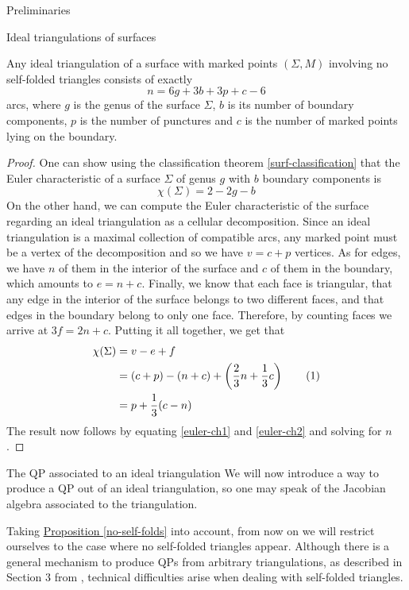 \begin{chapter}{Preliminaries}
\begin{section}{Ideal triangulations of surfaces}
\begin{prop} Any ideal triangulation of a surface with marked points $(\Sigma, M)$ involving no self-folded triangles consists of exactly
\[
n=6g+3b+3p+c-6
\]
arcs, where $g$ is the genus of the surface $\Sigma$, $b$ is its number of boundary components, $p$ is the number of punctures and $c$ is the number of marked points lying on the boundary.
\end{prop}
\begin{proof} One can show using the classification theorem \ref{surf-classification} that the Euler characteristic of a surface $\Sigma$ of genus $g$ with $b$ boundary components is
\begin{equation}\label{euler-ch1}
\chi(\Sigma)=2-2g-b
\end{equation}
On the other hand, we can compute the Euler characteristic of the surface regarding an ideal triangulation as a cellular decomposition. Since an ideal triangulation is a maximal collection of compatible arcs, any marked point must be a vertex of the decomposition and so we have $v = c + p$ vertices. As for edges, we have $n$ of them in the interior of the surface and $c$ of them in the boundary, which amounts to $e = n + c$. Finally, we know that each face is triangular, that any edge in the interior of the surface belongs to two different faces, and that edges in the boundary belong to only one face. Therefore, by counting faces we arrive at $3f = 2n+c$. Putting it all together, we get that
\begin{align*}\label{euler-ch2}
\chi(\Sigma)&=v-e+f\\
&=(c+p)-(n+c)+\left(\frac{2}{3}n+\frac{1}{3} c\right)\addtocounter{equation}{1}\tag{\theequation}\\
&=p+\frac{1}{3}(c-n)
\end{align*}
The result now follows by equating \eqref{euler-ch1} and \eqref{euler-ch2} and solving for $n$.
\end{proof}
\end{section}

\begin{section}{The QP associated to an ideal triangulation}\label{qp}
We will now introduce a way to produce a QP out of an ideal triangulation, so one may speak of the Jacobian algebra associated to the triangulation.

Taking \hyperref[no-self-folds]{Proposition \ref*{no-self-folds}} into account, from now on we will restrict ourselves to the case where no self-folded triangles appear. Although there is a general mechanism to produce QPs from arbitrary triangulations, as described in Section 3 from \cite{LF09}, technical difficulties arise when dealing with self-folded triangles.


\end{section}
\end{chapter}
